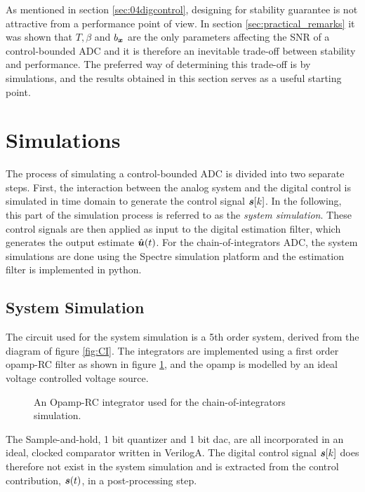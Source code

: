 As mentioned in section \ref{sec:04digcontrol}, designing for stability guarantee is not attractive from a performance point of view. In section \ref{sec:practical_remarks} it was shown that $T, \beta$ and $b_{\bm{x}}$ are the only parameters affecting the SNR of a control-bounded ADC and it is therefore an inevitable trade-off between stability and performance. The preferred way of determining this trade-off is by simulations, and the results obtained in this section serves as a useful starting point.















\section{Simulations}
The process of simulating a control-bounded ADC is divided into two separate steps. First, the interaction between the analog system and the digital control is simulated in time domain to generate the control signal $\bm{s}[k]$. In the following, this part of the simulation process is referred to as the \textit{system simulation}. These control signals are then applied as input to the digital estimation filter, which generates the output estimate $\hat{\bm{u}}(t)$. For the chain-of-integrators ADC, the system simulations are done using the Spectre simulation platform \cite{spectre} and the estimation filter is implemented in python.

\subsection{System Simulation}
The circuit used for the system simulation is a 5th order system, derived from the diagram of figure \ref{fig:CI}. The integrators are implemented using a first order opamp-RC filter as shown in figure \ref{fig:opampRCint}, and the opamp is modelled by an ideal voltage controlled voltage source.
\begin{figure}[htbp]
    \centering
    
    \caption{An Opamp-RC integrator used for the chain-of-integrators simulation.}
    \label{fig:opampRCint}
\end{figure}
The Sample-and-hold, 1 bit quantizer and 1 bit dac, are all incorporated in an ideal, clocked comparator written in VerilogA. The digital control signal $\bm{s}[k]$ does therefore not exist in the system simulation and is extracted from the control contribution, $\bm{s}(t)$, in a post-processing step.

